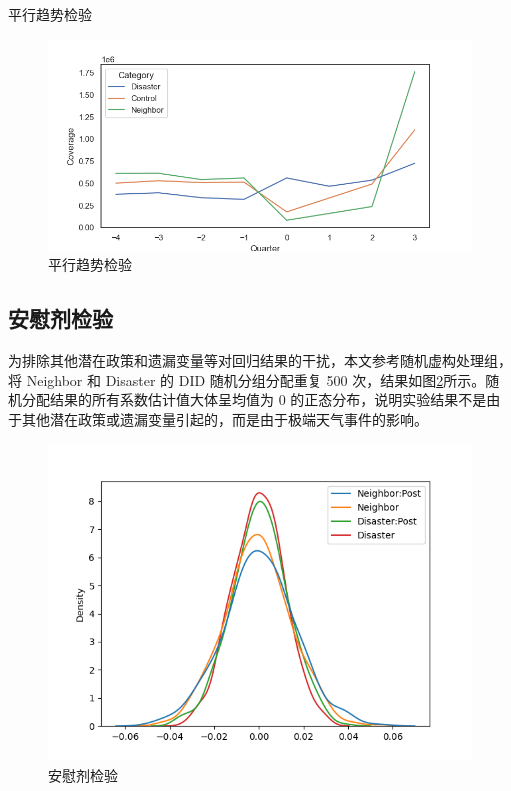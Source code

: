 \begin{table}[htbp]
    \centering
    \caption{平行趋势检验}\label{tab:robust}
    
\end{table}

\begin{figure}[htbp]
    \includegraphics[width=\linewidth]{lib/img/robust.png}
    \caption{平行趋势检验}\label{fig:robust}
\end{figure}
\subsection{安慰剂检验}
为排除其他潜在政策和遗漏变量等对回归结果的干扰，本文参考\citet{CYJJ202104009}随机虚构处理组，将 Neighbor 和 Disaster 的 DID 随机分组分配重复 500 次，结果如图\ref{fig:randomtest}所示。随机分配结果的所有系数估计值大体呈均值为 0 的正态分布，说明实验结果不是由于其他潜在政策或遗漏变量引起的，而是由于极端天气事件的影响。
\begin{figure}[H]
    \includegraphics[width=\linewidth]{lib/img/randomtest.png}
    \caption{安慰剂检验}\label{fig:randomtest}
\end{figure}

